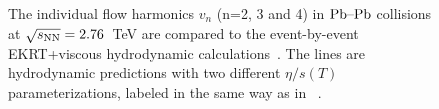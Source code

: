 \begin{figure}[h]
\begin{center}
        \caption{The individual flow harmonics $v_n$ (n=2, 3 and 4) in $\textnormal{Pb--Pb}$ collisions at $\sqrt{s_{\textnormal{NN}}}=2.76$~TeV are compared to the event-by-event EKRT+viscous hydrodynamic calculations~\cite{Niemi:2015qia}. The lines are hydrodynamic predictions with two different $\eta/s(T)$ parameterizations, labeled in the same way as in ~\cite{Niemi:2015qia}.}
        \label{fig:Figure_8}
              \end{center}
\end{figure}

